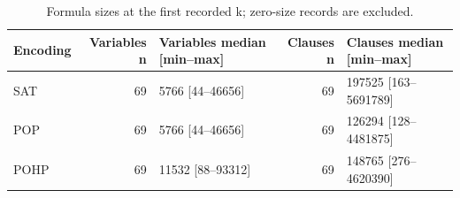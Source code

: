 \begin{table}[htbp]
\centering
\small
\caption{Formula sizes at the first recorded k; zero-size records are excluded.}
\label{tab:formula-size}
\begin{tabular}{lrlrl}
\hline
Encoding & Variables n & Variables median [min--max] & Clauses n & Clauses median [min--max] \\
\hline
SAT & 69 & 5766 [44--46656] & 69 & 197525 [163--5691789] \\
POP & 69 & 5766 [44--46656] & 69 & 126294 [128--4481875] \\
POHP & 69 & 11532 [88--93312] & 69 & 148765 [276--4620390] \\
\hline
\end{tabular}
\end{table}
